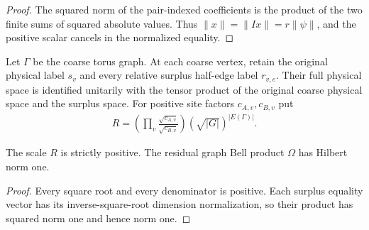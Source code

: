 \begin{proof}\leanok
    The squared norm of the pair-indexed coefficients is the product of
    the two finite sums of squared absolute values. Thus
    $\|x\|=\|Ix\|=r\|\psi\|$, and the positive scalar cancels in the
    normalized equality.
\end{proof}

\begin{definition}%
    \label{def:peps_two_by_two_original_output}
    \leanok
    Let $\Gamma$ be the coarse torus graph. At each coarse vertex, retain
    the original physical label $s_v$ and every relative surplus half-edge
    label $r_{v,e}$. Their full physical space is identified unitarily with
    the tensor product of the original coarse physical space and the surplus
    space. For positive site factors $c_{A,v},c_{B,v}$ put
    \begin{align}
        R=\left(\prod_v\frac{\sqrt{c_{A,v}}}{\sqrt{c_{B,v}}}\right)
        (\sqrt{|G|})^{|E(\Gamma)|}.
    \end{align}
\end{definition}

\begin{lemma}%
    \label{thm:peps_two_by_two_original_scale}
    \leanok
    The scale $R$ is strictly positive. The residual graph Bell product
    $\Omega$ has Hilbert norm one.
\end{lemma}

\begin{proof}\leanok
    Every square root and every denominator is positive. Each surplus
    equality vector has its inverse-square-root dimension normalization,
    so their product has squared norm one and hence norm one.
\end{proof}

